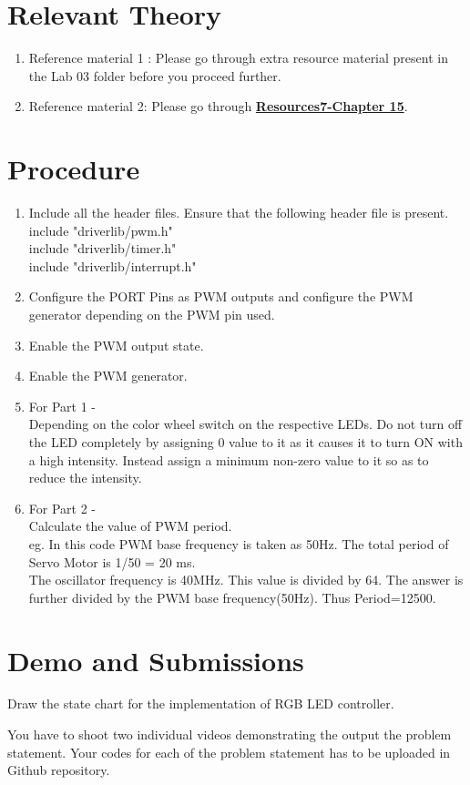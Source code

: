 \documentclass{article} %
\newcounter{source}
\begin{document}
\section {Relevant Theory}

\begin{enumerate}
\item Reference material 1 : Please go through extra resource material present in the Lab 03 folder before you proceed further.
\item Reference material 2: Please go through \href{https://www.cse.iitb.ac.in/~erts/html_pages/Resources/Tiva/TM4C123G_LaunchPad_Workshop_Workbook.pdf}{\textbf{Resources7-Chapter 15}}.
\end{enumerate}

\section {Procedure}
\begin{enumerate}
\item Include all the header files. Ensure that the following header file is present.\\
 include "driverlib/pwm.h"\\
 include "driverlib/timer.h"\\
 include "driverlib/interrupt.h"
 \item Configure the PORT Pins as PWM outputs and configure the PWM generator depending on the PWM pin used.
 \item  Enable the PWM output state.
 \item  Enable the PWM generator. 
\item For Part 1 - \\Depending on the color wheel switch on the respective LEDs. Do not turn off the LED completely by assigning 0 value to it as it causes it to turn ON with a high intensity. Instead assign a minimum non-zero value to it so as to reduce the intensity.   

\item For Part 2 - \\Calculate the value of PWM period. \\
eg. In this code PWM base frequency is taken as 50Hz. The total period of Servo Motor is 1/50 = 20 ms. \\ 
The oscillator frequency is 40MHz. This value is divided by 64. The answer is further divided by the PWM base frequency(50Hz).
Thus Period=12500. 

\end{enumerate}

\section {Demo and Submissions}
Draw the state chart for the implementation of RGB LED controller.

You have to shoot two individual videos demonstrating the output the problem statement.
Your codes for each of the problem statement has to be uploaded in Github repository.
\end{document}
